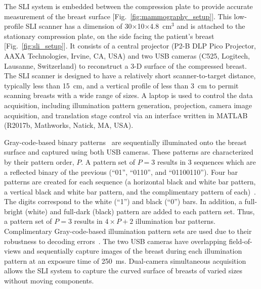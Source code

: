 The SLI system is embedded between the compression plate to provide accurate measurement of the breast surface [Fig.~\ref{fig:mammography_setup}]. This low-profile SLI scanner has a dimension of 30$\times$10$\times$4.8~cm$^3$ and is attached to the stationary compression plate, on the side facing the patient's breast [Fig.~\ref{fig:sli_setup}]. It consists of a central projector (P2-B DLP Pico Projector, AAXA Technologies, Irvine, CA, USA) and two USB cameras (C525, Logitech, Lausanne, Switzerland) to reconstruct a 3-D surface of the compressed breast. The SLI scanner is designed to have a relatively short scanner-to-target distance, typically less than 15~cm, and a vertical profile of less than 3~cm to permit scanning breasts with a wide range of sizes. A laptop is used to control the data acquisition, including illumination pattern generation, projection, camera image acquisition, and translation stage control via an interface written in MATLAB (R2017b, Mathworks, Natick, MA, USA).

Gray-code-based binary patterns~\cite{Inokuchi1984} are sequentially illuminated onto the breast surface and captured using both USB cameras. These patterns are characterized by their pattern order, $P$. A pattern set of $P=3$ results in 3 sequences which are a reflected binary of the previous (``01'', ``0110'', and ``01100110''). Four bar patterns are created for each sequence (a horizontal black and white bar pattern, a vertical black and white bar pattern, and the complimentary pattern of each)~\cite{Sels2019}. The digits correspond to the white (``1'') and black (``0'') bars. In addition, a full-bright (white) and full-dark (black) pattern are added to each pattern set. Thus, a pattern set of $P=3$ results in $4\times P+2$ illumination bar patterns. Complimentary Gray-code-based illumination pattern sets are used due to their robustness to decoding errors~\cite{Moreno2012}. The two USB cameras have overlapping field-of-views and sequentially capture images of the breast during each illumination pattern at an exposure time of 250~ms. Dual-camera simultaneous acquisition allows the SLI system to capture the curved surface of breasts of varied sizes without moving components. 

